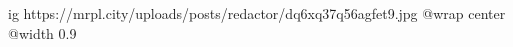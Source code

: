  
 
 
 
 

\ifcmt
  ig https://mrpl.city/uploads/posts/redactor/dq6xq37q56agfet9.jpg
  @wrap center
  @width 0.9
\fi
